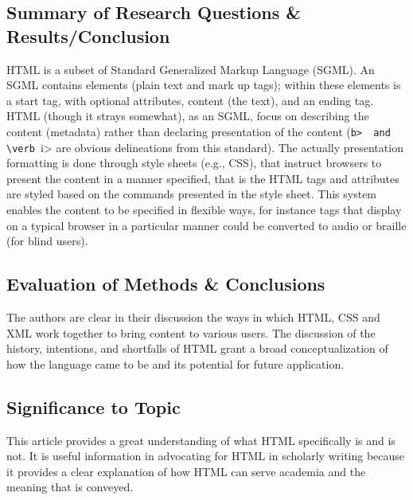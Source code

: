 \documentclass[leavefloats]{apa6e}\usepackage[]{graphicx}\usepackage[]{color}
\begin{document}
\subsection{Summary of Research Questions \& Results/Conclusion} %
HTML is a subset of Standard  Generalized  Markup  Language (SGML).  An SGML contains elements (plain text and mark up tags); within these elements is a start tag, with optional attributes, content (the text), and an ending tag.  HTML (though it strays somewhat), as an SGML, focus on describing the content (metadata) rather than declaring presentation of the content (\verb <b>  and \verb <i>  are obvious delineations from this standard).  The actually presentation formatting is done through style sheets (e.g., CSS), that instruct browsers to present the content in a manner specified, that is the HTML tags and attributes are styled based on the commands presented in the style sheet.  This system enables the content to be specified in flexible ways, for instance tags that display on a typical browser in a particular manner could be converted to audio or braille (for blind users).

\subsection{Evaluation of Methods \& Conclusions} %
The authors are clear in their discussion the ways in which HTML, CSS and XML work together to bring content to various users.  The discussion of the history, intentions, and shortfalls of HTML grant a broad conceptualization of how the language came to be and its potential for future application.

\subsection{Significance to Topic} %
This article provides a great understanding of what HTML specifically is and is not.  It is useful information in advocating for HTML in scholarly writing because it provides a clear explanation of how HTML can serve academia and the meaning that is conveyed.


 \section{\textcite{Lynch1996}}
\end{document}
